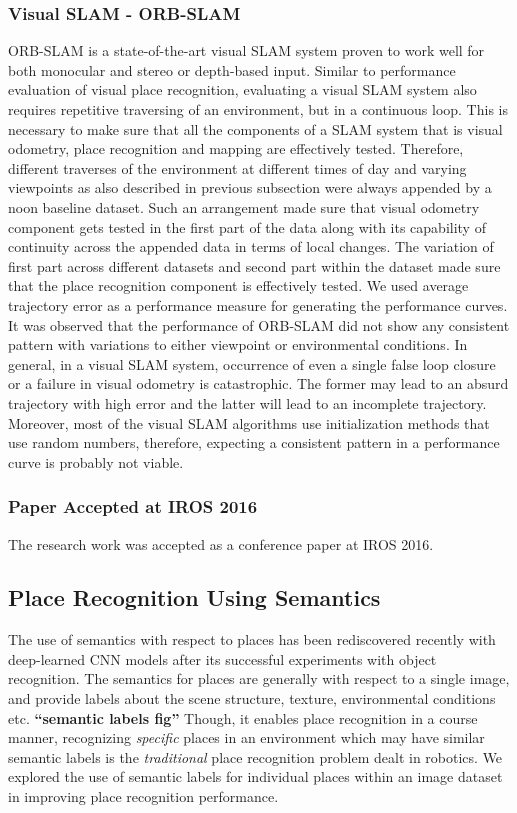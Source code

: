 \documentclass{article}
\begin{document}
\subsubsection{Visual SLAM - ORB-SLAM}
ORB-SLAM is a state-of-the-art visual SLAM system proven to work well for both monocular and stereo or depth-based input. Similar to performance evaluation of visual place recognition, evaluating a visual SLAM system also requires repetitive traversing of an environment, but in a continuous loop. This is necessary to make sure that all the components of a SLAM system that is visual odometry, place recognition and mapping are effectively tested. Therefore, different traverses of the environment at different times of day and varying viewpoints as also described in previous subsection were always appended by a noon baseline dataset. Such an arrangement made sure that visual odometry component gets tested in the first part of the data along with its capability of continuity across the appended data in terms of local changes. The variation of first part across different datasets and second part within the dataset made sure that the place recognition component is effectively tested. We used average trajectory error as a performance measure for generating the performance curves. It was observed that the performance of ORB-SLAM did not show any consistent pattern with variations to either viewpoint or environmental conditions. In general, in a visual SLAM system, occurrence of even a single false loop closure or a failure in visual odometry is catastrophic. The former may lead to an absurd trajectory with high error and the latter will lead to an incomplete trajectory. Moreover, most of the visual SLAM algorithms use initialization methods that use random numbers, therefore, expecting a consistent pattern in a performance curve is probably not viable.

\subsubsection{Paper Accepted at IROS 2016}
The research work was accepted as a conference paper at IROS 2016.

\subsection{Place Recognition Using Semantics}
The use of semantics with respect to places has been rediscovered recently with deep-learned CNN models after its successful experiments with object recognition. The semantics for places are generally with respect to a single image, and provide labels about the scene structure, texture, environmental conditions etc. \textbf{``semantic labels fig''} Though, it enables place recognition in a course manner, recognizing \emph{specific} places in an environment which may have similar semantic labels is the \emph{traditional} place recognition problem dealt in robotics. We explored the use of semantic labels for individual places within an image dataset in improving place recognition performance.
\end{document}
